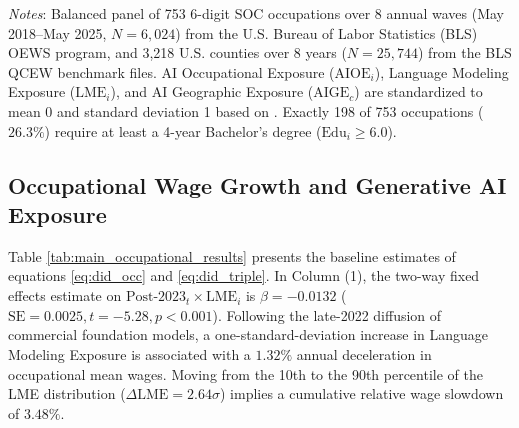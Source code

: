 \documentclass[12pt]{article}
\begin{document}
\begin{table}[htbp]
\begin{minipage}{\linewidth}
\footnotesize
\textit{Notes}: Balanced panel of 753 6-digit SOC occupations over 8 annual waves (May 2018--May 2025, $N = 6,024$) from the U.S. Bureau of Labor Statistics (BLS) OEWS program, and 3,218 U.S. counties over 8 years ($N = 25,744$) from the BLS QCEW benchmark files. AI Occupational Exposure ($\text{AIOE}_i$), Language Modeling Exposure ($\text{LME}_i$), and AI Geographic Exposure ($\text{AIGE}_c$) are standardized to mean 0 and standard deviation 1 based on \citet{felten2021, felten2023}. Exactly 198 of 753 occupations ($26.3\%$) require at least a 4-year Bachelor's degree ($\text{Edu}_i \ge 6.0$).
\end{minipage}
\end{table}

\subsection{Occupational Wage Growth and Generative AI Exposure}

Table \ref{tab:main_occupational_results} presents the baseline estimates of equations \eqref{eq:did_occ} and \eqref{eq:did_triple}. In Column (1), the two-way fixed effects estimate on $\text{Post-2023}_t \times \text{LME}_i$ is $\hat{\beta} = -0.0132$ ($\text{SE} = 0.0025, t = -5.28, p < 0.001$). Following the late-2022 diffusion of commercial foundation models, a one-standard-deviation increase in Language Modeling Exposure is associated with a $1.32\%$ annual deceleration in occupational mean wages. Moving from the 10th to the 90th percentile of the LME distribution ($\Delta \text{LME} = 2.64\sigma$) implies a cumulative relative wage slowdown of $3.48\%$.
\end{document}
